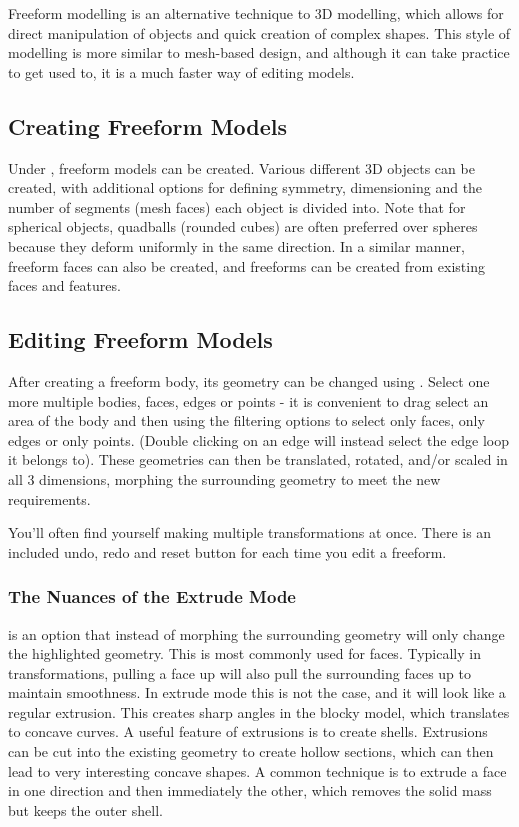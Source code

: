 Freeform modelling is an alternative technique to 3D modelling, which allows for direct manipulation of objects and quick creation of complex shapes. This style of modelling is more similar to mesh-based design, and although it can take practice to get used to, it is a much faster way of editing models.

\subsection{Creating Freeform Models}

Under , freeform models can be created. Various different 3D objects can be created, with additional options for defining symmetry, dimensioning and the number of segments (mesh faces) each object is divided into. Note that for spherical objects, quadballs (rounded cubes) are often preferred over spheres because they deform uniformly in the same direction. In a similar manner, freeform faces can also be created, and freeforms can be created from existing faces and features.

\subsection{Editing Freeform Models}

After creating a freeform body, its geometry can be changed using . Select one more multiple bodies, faces, edges or points - it is convenient to drag select an area of the body and then using the filtering options to select only faces, only edges or only points. (Double clicking on an edge will instead select the edge loop it belongs to). These geometries can then be translated, rotated, and/or scaled in all 3 dimensions, morphing the surrounding geometry to meet the new requirements.

You'll often find yourself making multiple transformations at once. There is an included undo, redo and reset button for each time you edit a freeform.

\subsubsection{The Nuances of the Extrude Mode}
 is an option that instead of morphing the surrounding geometry will only change the highlighted geometry. This is most commonly used for faces. Typically in transformations, pulling a face up will also pull the surrounding faces up to maintain smoothness. In extrude mode this is not the case, and it will look like a regular extrusion. This creates sharp angles in the blocky model, which translates to concave curves. A useful feature of extrusions is to create shells. Extrusions can be cut into the existing geometry to create hollow sections, which can then lead to very interesting concave shapes. A common technique is to extrude a face in one direction and then immediately the other, which removes the solid mass but keeps the outer shell.

